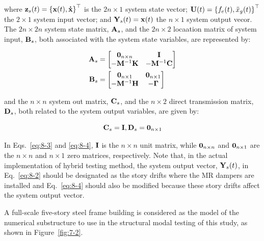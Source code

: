 where $\mathbf{z}_{s}(t) = \left\{\mathbf{x}(t), \mathbf{\dot{x}}\right\}^{\top}$ is the $2n \times 1$ system state vector; $\mathbf{U}(t) = \left\{f_{e}(t),\ddot{x}_{g}(t)\right\}^{\top}$ the $2\times1$ system input vector; and $\mathbf{Y}_{s}(t)=\mathbf{x}(t)$ the $n\times1$ system output vecor. The $2n\times2n$ system state matrix, $\mathbf{A}_{s}$, and the $2n\times2$ locaation matrix of system input, $\mathbf{B}_{s}$, both associated with the system state variables, are represented by:

\begin{equation}\label{eq:8-3}
\begin{aligned}
\mathbf{A}_{s} &= \begin{bmatrix} \mathbf{0}_{n\times n} & \mathbf{I} \\ -\mathbf{M}^{-1}\mathbf{K} & -\mathbf{M}^{-1}\mathbf{C}\end{bmatrix} \\
\mathbf{B}_{s} &= \begin{bmatrix} \mathbf{0}_{n\times1} & \mathbf{0}_{n\times1} \\ -\mathbf{M}^{-1}\mathbf{H} & -\mathbf{\Gamma} \end{bmatrix}
\end{aligned}
\end{equation}

and the $n\times n$ system out matrix, $\mathbf{C}_{s}$, and the $n\times2$ direct transmission matrix, $\mathbf{D}_{s}$, both related to the system output variables, are given by:

\begin{equation}\label{eq:8-4}
\mathbf{C}_{s} = \mathbf{I}, \mathbf{D}_{s} = \mathbf{0}_{n\times1}
\end{equation}

In Eqs.~\eqref{eq:8-3} and \eqref{eq:8-4}, $\mathbf{I}$ is the $n\times n$ unit matrix, while $\mathbf{0}_{n\times n}$ and $\mathbf{0}_{n\times1}$ are the $n\times n$ and $n\times1$ zero matrices, respectively. Note that, in the actual implementation of hybrid testing method, the system output vector, $\mathbf{Y}_{s}(t)$, in Eq.~\eqref{eq:8-2} should be designated as the story drifts where the MR dampers are installed and Eq.~\eqref{eq:8-4} should also be modified because these story drifts affect the system output vector.

A full-scale five-story steel frame building is considered as the model of the numerical substructure to use in the structural modal testing of this study, as shown in Figure~\ref{fig:7-2}. 

